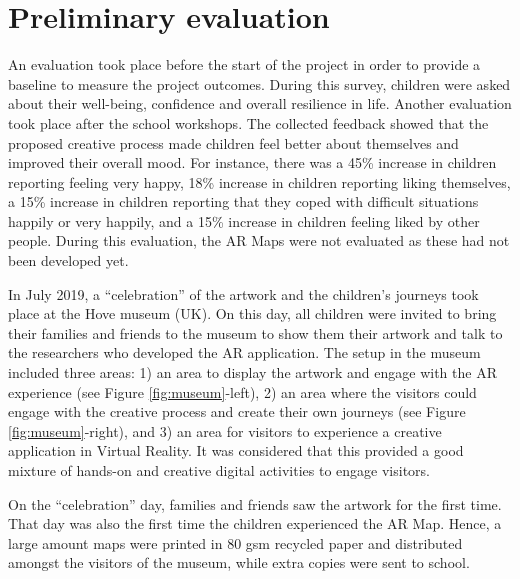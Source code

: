 \documentclass[acmlarge,screen,dvipsnames]{acmart}
\begin{document}
\section{Preliminary evaluation} \label{eval} An evaluation took place before
the start of the project in order to provide a baseline to measure the
project outcomes. During this survey, children were asked about their
well-being, confidence and overall resilience in life. Another evaluation took
place after the school workshops. The collected feedback showed that the proposed creative process made children feel better about themselves and improved their overall mood. For
instance, there was a 45\% increase in children reporting feeling very happy,
18\% increase in children reporting liking themselves, a 15\% increase in
children reporting that they coped with difficult situations happily or very
happily, and a 15\% increase in children feeling liked by other people. During
this evaluation, the AR Maps were not evaluated as these had not been developed yet.

In July 2019, a ``celebration'' of the artwork and the children's journeys took
place at the Hove museum (UK). On this day, all children were invited to
bring their families and friends to the museum to show them their artwork and talk to the
researchers who developed the AR application. The setup in the museum included
three areas: 1) an area to display the artwork and engage with the AR
experience (see Figure \ref{fig:museum}-left), 2) an area where the visitors could engage with the creative process and create their own journeys (see Figure
\ref{fig:museum}-right), and 3) an area for visitors to experience a creative
application in Virtual Reality. It was considered that this provided a good mixture
of hands-on and creative digital activities to engage visitors.

On the ``celebration'' day, families and friends saw the artwork for the first time. That day was also the first time the children experienced the AR Map. Hence, a
large amount maps were printed in 80 gsm recycled paper and distributed amongst the
visitors of the museum, while extra copies were sent to school.
\end{document}
